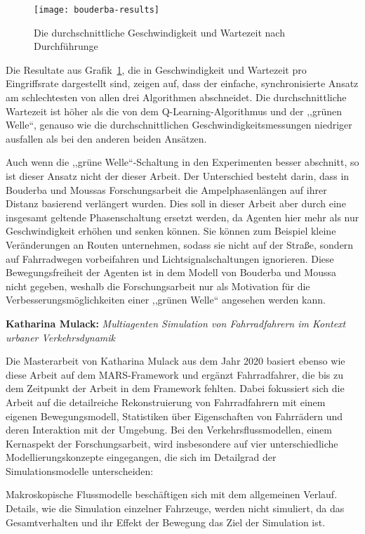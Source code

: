\begin{figure}[h]
    \centering
    \texttt{[image: bouderba-results]}~\caption{Die durchschnittliche Geschwindigkeit und Wartezeit nach Durchführunge~\cite{Bouderba2019}}
    \label{fig:bouderba-result-graph}
\end{figure}


Die Resultate aus Grafik~\ref{fig:bouderba-result-graph}, die in Geschwindigkeit und Wartezeit pro Eingriffsrate dargestellt sind, zeigen auf, dass der einfache, synchronisierte Ansatz am schlechtesten von allen drei Algorithmen abschneidet.
Die durchschnittliche Wartezeit ist höher als die von dem Q-Learning-Algorithmus und der ,,grünen Welle``, genauso wie die durchschnittlichen Geschwindigkeitsmessungen niedriger ausfallen als bei den anderen beiden Ansätzen.

Auch wenn die ,,grüne Welle``-Schaltung in den Experimenten besser abschnitt, so ist dieser Ansatz nicht der dieser Arbeit.
Der Unterschied besteht darin, dass in Bouderba und Moussas Forschungsarbeit die Ampelphasenlängen auf ihrer Distanz basierend verlängert wurden.
Dies soll in dieser Arbeit aber durch eine insgesamt geltende Phasenschaltung ersetzt werden, da Agenten hier mehr als nur Geschwindigkeit erhöhen und senken können.
Sie können zum Beispiel kleine Veränderungen an Routen unternehmen, sodass sie nicht auf der Straße, sondern auf Fahrradwegen vorbeifahren und Lichtsignalschaltungen ignorieren.
Diese Bewegungsfreiheit der Agenten ist in dem Modell von Bouderba und Moussa nicht gegeben, weshalb die Forschungsarbeit nur als Motivation für die Verbesserungsmöglichkeiten einer ,,grünen Welle`` angesehen werden kann.


\textbf{Katharina Mulack:}
\textit{Multiagenten Simulation von Fahrradfahrern im Kontext urbaner Verkehrsdynamik}

Die Masterarbeit von Katharina Mulack aus dem Jahr 2020 basiert ebenso wie diese Arbeit auf dem MARS-Framework und ergänzt Fahrradfahrer, die bis zu dem Zeitpunkt der Arbeit in dem Framework fehlten.
Dabei fokussiert sich die Arbeit auf die detailreiche Rekonstruierung von Fahrradfahrern mit einem eigenen Bewegungsmodell, Statistiken über Eigenschaften von Fahrrädern und deren Interaktion mit der Umgebung\cite{Mulack2020}.
Bei den Verkehrsflussmodellen, einem Kernaspekt der Forschungsarbeit, wird insbesondere auf vier unterschiedliche Modellierungskonzepte eingegangen, die sich im Detailgrad der Simulationsmodelle unterscheiden:

Makroskopische Flussmodelle beschäftigen sich mit dem allgemeinen Verlauf.
Details, wie die Simulation einzelner Fahrzeuge, werden nicht simuliert, da das Gesamtverhalten und ihr Effekt der Bewegung das Ziel der Simulation ist\cite{Mulack2020}.

